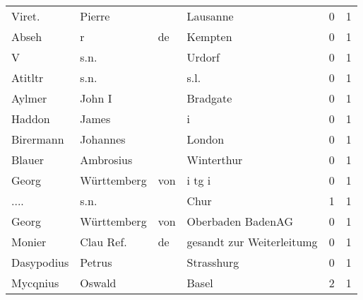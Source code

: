 \begin{center}
\begin{tiny}
\begin{longtabu}{llllrr}
                   Viret. &                             Pierre &             &                                    Lausanne &          0 &         1 \\
                    Abseh &                                  r &          de &                                     Kempten &          0 &         1 \\
                        V &                               s.n. &             &                                      Urdorf &          0 &         1 \\
                  Atitltr &                               s.n. &             &                                        s.l. &          0 &         1 \\
                   Aylmer &                             John I &             &                                    Bradgate &          0 &         1 \\
                   Haddon &                              James &             &                                           i &          0 &         1 \\
                Birermann &                           Johannes &             &                                      London &          0 &         1 \\
                   Blauer &                          Ambrosius &             &                                  Winterthur &          0 &         1 \\
                    Georg &                        Württemberg &         von &                                      i tg i &          0 &         1 \\
                     .... &                               s.n. &             &                                        Chur &          1 &         1 \\
                    Georg &                        Württemberg &         von &                           Oberbaden BadenAG &          0 &         1 \\
                   Monier &                          Clau Ref. &          de &                   gesandt zur Weiterleitumg &          0 &         1 \\
               Dasypodius &                             Petrus &             &                                  Strasshurg &          0 &         1 \\
                 Mycqnius &                             Oswald &             &                                       Basel &          2 &         1 \\

\end{longtabu}
\end{tiny}
\end{center}

